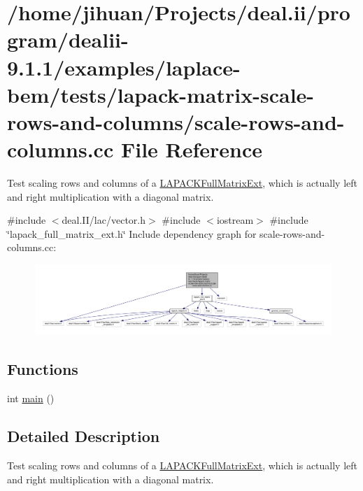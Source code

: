 \hypertarget{scale-rows-and-columns_8cc}{}\section{/home/jihuan/\+Projects/deal.ii/program/dealii-\/9.1.1/examples/laplace-\/bem/tests/lapack-\/matrix-\/scale-\/rows-\/and-\/columns/scale-\/rows-\/and-\/columns.cc File Reference}
\label{scale-rows-and-columns_8cc}


Test scaling rows and columns of a \hyperlink{classLAPACKFullMatrixExt}{L\+A\+P\+A\+C\+K\+Full\+Matrix\+Ext}, which is actually left and right multiplication with a diagonal matrix.  


{\ttfamily \#include $<$deal.\+I\+I/lac/vector.\+h$>$}\newline
{\ttfamily \#include $<$iostream$>$}\newline
{\ttfamily \#include \char`\"{}lapack\+\_\+full\+\_\+matrix\+\_\+ext.\+h\char`\"{}}\newline
Include dependency graph for scale-\/rows-\/and-\/columns.cc\+:\nopagebreak
\begin{figure}[H]
\begin{center}
\leavevmode
\includegraphics[width=350pt]{scale-rows-and-columns_8cc__incl}
\end{center}
\end{figure}
\subsection*{Functions}
\begin{DoxyCompactItemize}
\item 
int \hyperlink{scale-rows-and-columns_8cc_ae66f6b31b5ad750f1fe042a706a4e3d4}{main} ()
\end{DoxyCompactItemize}


\subsection{Detailed Description}
Test scaling rows and columns of a \hyperlink{classLAPACKFullMatrixExt}{L\+A\+P\+A\+C\+K\+Full\+Matrix\+Ext}, which is actually left and right multiplication with a diagonal matrix. 

